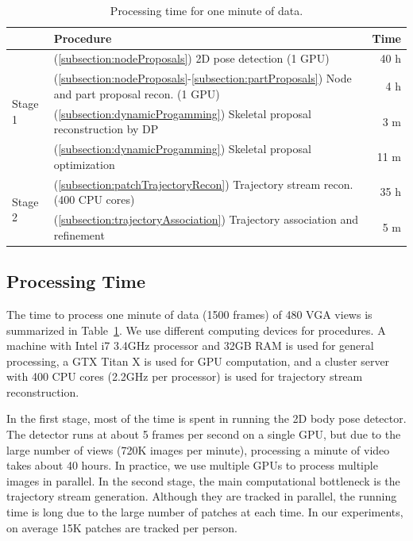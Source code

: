 \begin{table} [t]	
	\centering
	\caption{Processing time for one minute of data.}\label{Table:questionaire}
	\begin{tabular}{l | l|  r}
		\hline
		&  Procedure & Time  \tabularnewline
		\hline
		\multirow{4}{*}{Stage 1} & (\ref{subsection:nodeProposals}) 2D pose detection (1 GPU) &  40 h  \\
		
		&(\ref{subsection:nodeProposals}-\ref{subsection:partProposals})  Node and part proposal recon. (1 GPU) &  4 h  \\
		
		&(\ref{subsection:dynamicProgamming}) Skeletal proposal reconstruction by DP  &  3 m  \\
		
		&(\ref{subsection:dynamicProgamming}) Skeletal proposal optimization  &  11 m  \\
		\hline
		\multirow{2}{*}{Stage 2} & (\ref{subsection:patchTrajectoryRecon}) Trajectory stream recon. (400 CPU cores)  &  35 h  \\ %
		& (\ref{subsection:trajectoryAssociation}) Trajectory association and refinement &  5 m  \\
		\hline
	\end{tabular} 
	\label{table:processingTime}
\end{table}

\subsection{Processing Time}
The time to process one minute of data (1500 frames) of 480 VGA views is summarized in Table~\ref{table:processingTime}. We use different computing devices for procedures.  A machine with Intel i7 3.4GHz processor and 32GB RAM is used for general processing, a GTX Titan X is used for GPU computation, and a cluster server with 400 CPU cores (2.2GHz per processor) is used for trajectory stream reconstruction. 

In the first stage, most of the time is spent in running the 2D body pose detector. The detector runs at about 5 frames per second on a single GPU, but due to the large number of views (720K images per minute),  processing a minute of video takes about 40 hours. In practice, we use multiple GPUs to process multiple images in parallel. In the second stage, the main computational bottleneck is the trajectory stream generation. Although they are tracked in parallel, the running time is long due to the large number of patches at each time. In our experiments, on average 15K patches are tracked per person. 

